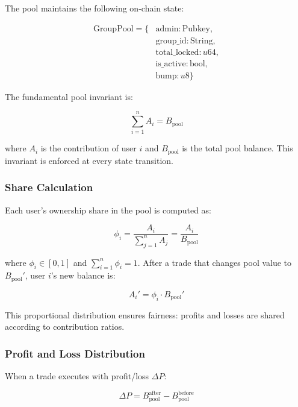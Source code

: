 \documentclass[11pt,a4paper]{article}
\begin{document}
The pool maintains the following on-chain state:

\begin{align}
\text{GroupPool} = \{ &\text{admin}: \text{Pubkey}, \\
&\text{group\_id}: \text{String}, \\
&\text{total\_locked}: u64, \\
&\text{is\_active}: \text{bool}, \\
&\text{bump}: u8 \}
\end{align}

The fundamental pool invariant is:

\begin{equation}
\sum_{i=1}^{n} A_i = B_{\text{pool}}
\end{equation}

where $A_i$ is the contribution of user $i$ and $B_{\text{pool}}$ is the total pool balance. This invariant is enforced at every state transition.

\subsubsection{Share Calculation}

Each user's ownership share in the pool is computed as:

\begin{equation}
\phi_i = \frac{A_i}{\sum_{j=1}^{n} A_j} = \frac{A_i}{B_{\text{pool}}}
\end{equation}

where $\phi_i \in [0,1]$ and $\sum_{i=1}^{n} \phi_i = 1$. After a trade that changes pool value to $B_{\text{pool}}'$, user $i$'s new balance is:

\begin{equation}
A_i' = \phi_i \cdot B_{\text{pool}}'
\end{equation}

This proportional distribution ensures fairness: profits and losses are shared according to contribution ratios.

\subsubsection{Profit and Loss Distribution}

When a trade executes with profit/loss $\Delta P$:

\begin{equation}
\Delta P = B_{\text{pool}}^{\text{after}} - B_{\text{pool}}^{\text{before}}
\end{equation}
\end{document}
